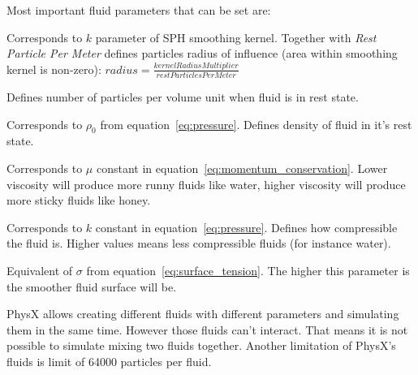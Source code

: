 Most important fluid parameters that can be set are:
\begin{description}\itemsep1pt
\item[Kernel Radius Multiplier] Corresponds to $k$ parameter of SPH smoothing kernel. Together with \textit{Rest Particle Per Meter} defines particles radius of influence (area within smoothing kernel is non-zero): $radius = \frac{kernelRadiusMultiplier}{restParticlesPerMeter}$
\item[Rest Particles Per Meter] Defines number of particles per volume unit when fluid is in rest state.
\item[Rest Density] Corresponds to $\rho_0$ from equation~\ref{eq:pressure}. Defines density of fluid in it's rest state.
\item[Viscosity] Corresponds to $\mu$ constant in equation~\ref{eq:momentum_conservation}. Lower viscosity will produce more runny fluids like water, higher viscosity will produce more sticky fluids like honey.
\item[Stiffness] Corresponds to $k$ constant in equation~\ref{eq:pressure}. Defines how compressible the fluid is. Higher values means less compressible fluids (for instance water). 
\item[Surface Tension] Equivalent of $\sigma$ from equation~\ref{eq:surface_tension}. The higher this parameter is the smoother fluid surface will be. 
\end{description}

PhysX allows creating different fluids with different parameters and simulating them in the same time. However those fluids can't interact. That means it is not possible to simulate mixing two fluids together. Another limitation of PhysX's fluids is limit of 64000 particles per fluid.




